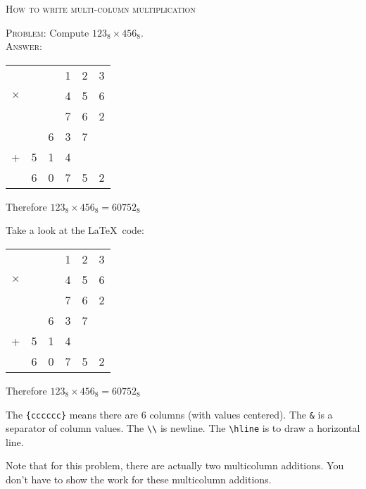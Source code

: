         \textsc{How to write multi-column multiplication}

\textsc{Problem:} Compute $123_{8} \times 456_{8}$.
\\
\textsc{Answer:}\vspace{-2mm}
\begin{answerlong}
\begin{longtable}{cccccc}
         &   &   & 1 & 2 & 3 \\
$\times$ &   &   & 4 & 5 & 6 \\ \hline
         &   &   & 7 & 6 & 2 \\
         &   & 6 & 3 & 7 &   \\ 
  +      & 5 & 1 & 4 &   &   \\ \hline
         & 6 & 0 & 7 & 5 & 2 \\ \hline
\end{longtable}
Therefore $123_{8} \times 456_{8} = 60752_{8}$
\end{answerlong}

Take a look at the \LaTeX\ code:
\begin{console}[fontsize=\footnotesize]
\begin{longtable}{cccccc}
         &   &   & 1 & 2 & 3 \\
$\times$ &   &   & 4 & 5 & 6 \\ \hline
         &   &   & 7 & 6 & 2 \\
         &   & 6 & 3 & 7 &   \\ 
  +      & 5 & 1 & 4 &   &   \\ \hline
         & 6 & 0 & 7 & 5 & 2 \\ \hline
\end{longtable}
Therefore $123_{8} \times 456_{8} = 60752_{8}$
\end{console}
The \verb!{cccccc}! means there are 6 columns (with values centered).
The \verb!&! is a separator of column values.
The \verb!\\! is newline.
The \verb!\hline! is to draw a horizontal line.

Note that for this problem,
there are actually two multicolumn additions.
You don't have to show the work for these multicolumn additions.
